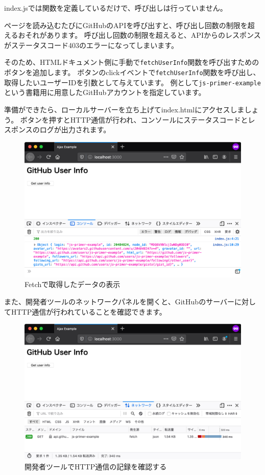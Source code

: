 index.jsでは関数を定義しているだけで、呼び出しは行っていません。

ページを読み込むたびにGitHubのAPIを呼び出すと、呼び出し回数の制限を超えるおそれがあります。
呼び出し回数の制限を超えると、APIからのレスポンスがステータスコード403のエラーになってしまいます。

そのため、HTMLドキュメント側に手動で\texttt{fetchUserInfo}関数を呼び出すためのボタンを追加します。
ボタンのclickイベントで\texttt{fetchUserInfo}関数を呼び出し、取得したいユーザーIDを引数として与えています。
例として\texttt{js-primer-example}という書籍用に用意したGitHubアカウントを指定しています。



準備ができたら、ローカルサーバーを立ち上げてindex.htmlにアクセスしましょう。
ボタンを押すとHTTP通信が行われ、コンソールにステータスコードとレスポンスのログが出力されます。

\begin{figure}[h]
\centering
\includegraphics[width=120mm]{fig/fig-2.pdf}
\caption{Fetchで取得したデータの表示}
\end{figure}

また、開発者ツールのネットワークパネルを開くと、GitHubのサーバーに対してHTTP通信が行われていることを確認できます。

\begin{figure}[h]
\centering
\includegraphics[width=120mm]{fig/fig-3.pdf}
\caption{開発者ツールでHTTP通信の記録を確認する}
\end{figure}


